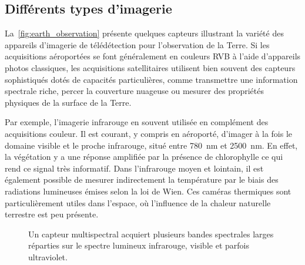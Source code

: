 \subsection{Différents types d'imagerie}

La~\cref{fig:earth_observation} présente quelques capteurs illustrant la variété des appareils d'imagerie de télédétection pour l'observation de la Terre. Si les acquisitions aéroportées se font généralement en couleurs \gls{RVB} à l'aide d'appareils photos classiques, les acquisitions satellitaires utilisent bien souvent des capteurs sophistiqués dotés de capacités particulières, comme transmettre une information spectrale riche, percer la couverture nuageuse ou mesurer des propriétés physiques de la surface de la Terre.

Par exemple, l'imagerie infrarouge en souvent utilisée en complément des acquisitions couleur. Il est courant, y compris en aéroporté, d'imager à la fois le domaine visible et le proche infrarouge, situé entre \SI{780}{\nano\meter} et \SI{2 500}{\nano\meter}. En effet, la végétation y a une réponse amplifiée par la présence de chlorophylle ce qui rend ce signal très informatif. Dans l'infrarouge moyen et lointain, il est également possible de mesurer indirectement la température par le biais des radiations lumineuses émises selon la loi de Wien. Ces caméras thermiques sont particulièrement utiles dans l'espace, où l'influence de la chaleur naturelle terrestre est peu présente.

\begin{figure}
  \resizebox{\textwidth}{!}{
  
  }
  \caption{Un capteur multispectral acquiert plusieurs bandes spectrales larges réparties sur le spectre lumineux infrarouge, visible et parfois ultraviolet.}
  \label{fig:multispectral}
\end{figure}


